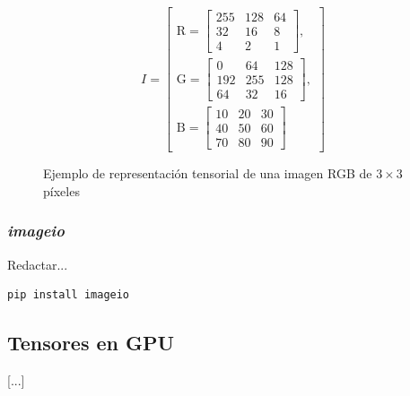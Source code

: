 \begin{figure}[h]
	\centering
	\begin{minipage}{0.6\textwidth}
		\[
			I =
			\left[
				\begin{array}{l}
					\text{R} =
					\begin{bmatrix}
						255 & 128 & 64 \\
						32  & 16  & 8  \\
						4   & 2   & 1
					\end{bmatrix},  \\[2em]
					\text{G} =
					\begin{bmatrix}
						0   & 64  & 128 \\
						192 & 255 & 128 \\
						64  & 32  & 16
					\end{bmatrix}, \\[2em]
					\text{B} =
					\begin{bmatrix}
						10 & 20 & 30 \\
						40 & 50 & 60 \\
						70 & 80 & 90
					\end{bmatrix}
				\end{array}
				\right]
		\]
	\end{minipage}
	\caption{Ejemplo de representación tensorial de una imagen RGB de $3 \times 3$ píxeles}
	\label{fig:image_tensor_example}
\end{figure}

\newpage
\subsubsection{\textit{imageio}} \label{sec:intro_imageio}
Redactar...

\begin{lstlisting}[language=bash, caption={Comando de instalación de \textit{imageio}}, label={lst: intro_install_imageio}]
pip install imageio
\end{lstlisting}

\subsection{Tensores en GPU} \label{sec:intro_tensors_gpu}
[...]


